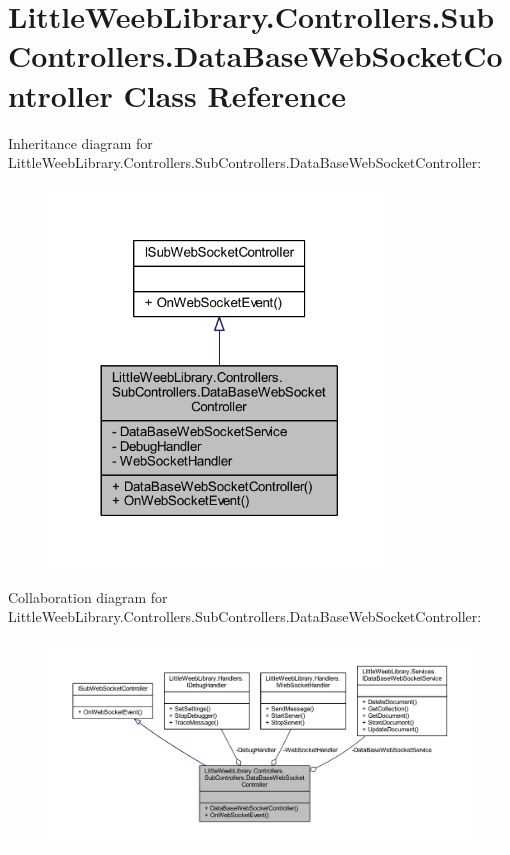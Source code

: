 \hypertarget{class_little_weeb_library_1_1_controllers_1_1_sub_controllers_1_1_data_base_web_socket_controller}{}\section{Little\+Weeb\+Library.\+Controllers.\+Sub\+Controllers.\+Data\+Base\+Web\+Socket\+Controller Class Reference}
\label{class_little_weeb_library_1_1_controllers_1_1_sub_controllers_1_1_data_base_web_socket_controller}


Inheritance diagram for Little\+Weeb\+Library.\+Controllers.\+Sub\+Controllers.\+Data\+Base\+Web\+Socket\+Controller\+:\nopagebreak
\begin{figure}[H]
\begin{center}
\leavevmode
\includegraphics[width=257pt]{class_little_weeb_library_1_1_controllers_1_1_sub_controllers_1_1_data_base_web_socket_controller__inherit__graph}
\end{center}
\end{figure}


Collaboration diagram for Little\+Weeb\+Library.\+Controllers.\+Sub\+Controllers.\+Data\+Base\+Web\+Socket\+Controller\+:\nopagebreak
\begin{figure}[H]
\begin{center}
\leavevmode
\includegraphics[width=350pt]{class_little_weeb_library_1_1_controllers_1_1_sub_controllers_1_1_data_base_web_socket_controller__coll__graph}
\end{center}
\end{figure}
